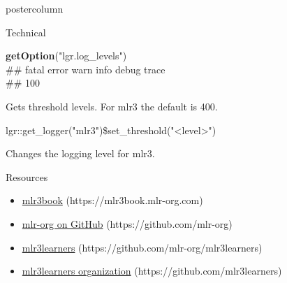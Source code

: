 \documentclass{beamer}
\begin{document}
\begin{withoutheader}
\begin{frame}[fragile]{}
\begin{columns}
\begin{column}{.245\textwidth}
\begin{beamercolorbox}[center]{postercolumn}
\begin{minipage}{.98\textwidth}
{\begin{myblock}{Technical}
							\\
							\begin{codeboxmultiline}[width=23.1cm]
								\textbf{getOption}("lgr.log\_levels")\\
								\#\# fatal error  warn  info debug trace\\ 
								\#\# 100 \space{} \space{}  \space 500 \space{}
							\end{codeboxmultiline}
							Gets threshold levels. For {mlr3} the default is 400. 
							\\
							\begin{codeboxmultiline}[width=25cm]
								\footnotesize{
								lgr::get\_logger("mlr3")\$set\_threshold("<level>")
							}
							\end{codeboxmultiline}
							Changes the logging level for {mlr3}.
						\end{myblock}
						\begin{myblock}{Resources}
							\begin{itemize}
								\item \href{https://mlr3book.mlr-org.com/index.html}{mlr3book} (https://mlr3book.mlr-org.com)
								\item \href{https://github.com/mlr-org}{mlr-org on GitHub} (https://github.com/mlr-org)
								\item \href{https://github.com/mlr-org/mlr3learners}{mlr3learners} (https://github.com/mlr-org/mlr3learners)
								\item \href{https://github.com/mlr3learners}{mlr3learners organization} (https://github.com/mlr3learners)
								\vspace{1em}
							\end{itemize}
						\end{myblock}
						\vfill
					}
				\end{minipage}
			\end{beamercolorbox}
		\end{column}
	\end{columns}
\end{frame}
\end{withoutheader}
\end{document}
